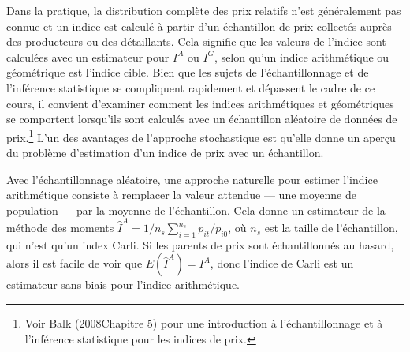 \documentclass[
]{article}
\begin{document}
Dans la pratique, la distribution complète des prix relatifs n'est généralement pas connue et un indice est calculé à partir d'un échantillon de prix collectés auprès des producteurs ou des détaillants. Cela signifie que les valeurs de l'indice sont calculées avec un estimateur pour \(I^{A}\) ou \(I^{G}\), selon qu'un indice arithmétique ou géométrique est l'indice cible. Bien que les sujets de l'échantillonnage et de l'inférence statistique se compliquent rapidement et dépassent le cadre de ce cours, il convient d'examiner comment les indices arithmétiques et géométriques se comportent lorsqu'ils sont calculés avec un échantillon aléatoire de données de prix.\footnote{Voir Balk (2008Chapitre 5) pour une introduction à l'échantillonnage et à l'inférence statistique pour les indices de prix.} L'un des avantages de l'approche stochastique est qu'elle donne un aperçu du problème d'estimation d'un indice de prix avec un échantillon.

Avec l'échantillonnage aléatoire, une approche naturelle pour estimer l'indice arithmétique consiste à remplacer la valeur attendue --- une moyenne de population --- par la moyenne de l'échantillon. Cela donne un estimateur de la méthode des moments \(\hat {I}^A = 1 / n_{s} \sum_{i = 1}^{n_{s}} p_{it} / p_{i0}\), où \(n_{s}\) est la taille de l'échantillon, qui n'est qu'un index Carli. Si les parents de prix sont échantillonnés au hasard, alors il est facile de voir que \(E(\hat {I}^{A}) = I^{A}\), donc l'indice de Carli est un estimateur sans biais pour l'indice arithmétique.
\end{document}

